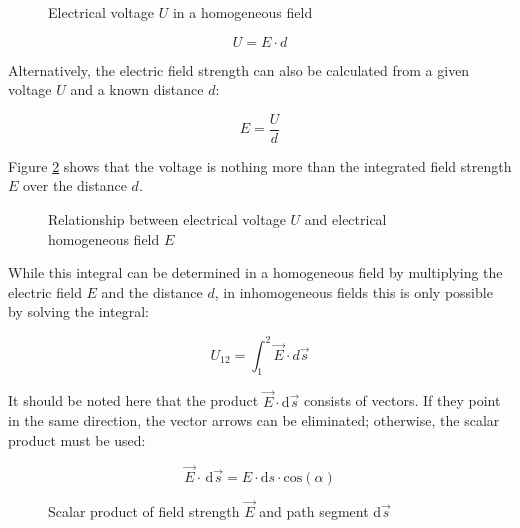 \begin{frame}
{	 
	  \begin{figure}[h!]
		\renewcommand{\figurename}{Figure}
		\centering
		
		\caption{Electrical voltage $U$ in a homogeneous field}
		\label{fig:spannunghomogen}
	\end{figure}

	 



	\begin{equation}
	 U = E \cdot d
	\end{equation}

	
	Alternatively, the electric field strength can also be calculated from a given voltage $U$ and a known distance $d$:
	
	\begin{equation}
		E = \frac{U}{d}
	   \end{equation}

	Figure \ref{fig:spannunggraph} shows that the voltage is nothing more than the integrated field strength $E$ over the distance $d$.
	

	\begin{figure}[h!]
		\renewcommand{\figurename}{Figure}
		\centering
		
		\caption{Relationship between electrical voltage $U$ and electrical homogeneous field $E$}
		\label{fig:spannunggraph}
	\end{figure}



	While this integral can be determined in a homogeneous field by multiplying the electric field $E$ and the distance $d$,
 	in inhomogeneous fields this is only possible by solving the integral:
	
	\begin{equation}
		U_{12} =\int_{1}^{2} \vec{E} \cdot d \vec{s}
	\end{equation}

	It should be noted here that the product $\vec{E} \cdot \mathrm{d} \vec{s}$ consists of vectors. If they point in the
    same direction, the vector arrows can be eliminated; otherwise, the scalar product must be used:


		\begin{equation*}
			\vec{E} \cdot \, \mathrm{d} \vec{s} =  E \cdot \mathrm{d} s \cdot \mathrm{cos} (\alpha)
		\end{equation*}


		\begin{figure}[h!]
			\renewcommand{\figurename}{Figure}
			\centering
			
			\caption{Scalar product of field strength $\vec{E}$ and path segment d$\vec{s}$}
			\label{fig:skalarprodukt}
		\end{figure}
	




}
\end{frame}
